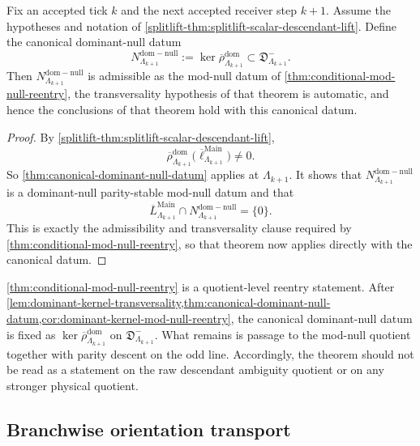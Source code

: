 \documentclass[11pt]{article}
\begin{document}
\begin{corollary}
\label{cor:dominant-kernel-mod-null-reentry}
Fix an accepted tick \(k\) and the next accepted receiver step \(k+1\).
Assume the hypotheses and notation of
\cref{splitlift-thm:splitlift-scalar-descendant-lift}.
Define the canonical dominant-null datum
\[
N^{\mathrm{dom-null}}_{\Lambda_{k+1}}
:=
\ker \overline{\rho}^{\mathrm{dom}}_{\Lambda_{k+1}}
\subset
\mathfrak D^-_{\Lambda_{k+1}}.
\]
Then \(N^{\mathrm{dom-null}}_{\Lambda_{k+1}}\) is admissible as the mod-null datum of
\cref{thm:conditional-mod-null-reentry}, the transversality hypothesis of that theorem is
automatic, and hence the conclusions of that theorem hold with this canonical datum.
\end{corollary}

\begin{proof}
By \cref{splitlift-thm:splitlift-scalar-descendant-lift},
\[
\overline{\rho}^{\mathrm{dom}}_{\Lambda_{k+1}}
\!\bigl(
\overline\ell^{\mathrm{Main}}_{\Lambda_{k+1}}
\bigr)
\neq 0.
\]
So \cref{thm:canonical-dominant-null-datum} applies at \(\Lambda_{k+1}\).
It shows that
\(
N^{\mathrm{dom-null}}_{\Lambda_{k+1}}
\)
is a dominant-null parity-stable mod-null datum and that
\[
\overline L^{\mathrm{Main}}_{\Lambda_{k+1}}
\cap
N^{\mathrm{dom-null}}_{\Lambda_{k+1}}
=
\{0\}.
\]
This is exactly the admissibility and transversality clause required by
\cref{thm:conditional-mod-null-reentry}, so that theorem now applies directly with the canonical
datum.
\end{proof}

\begin{remark}
\label{rem:conditional-mod-null-reentry}
\cref{thm:conditional-mod-null-reentry} is a quotient-level reentry statement.
After
\cref{lem:dominant-kernel-transversality,thm:canonical-dominant-null-datum,cor:dominant-kernel-mod-null-reentry},
the canonical dominant-null datum is fixed as
\(
\ker\overline{\rho}^{\mathrm{dom}}_{\Lambda_{k+1}}
\)
on \(\mathfrak D^-_{\Lambda_{k+1}}\).
What remains is passage to the mod-null quotient together with parity descent on the odd line.
Accordingly, the theorem should not be read as a statement on the raw descendant ambiguity quotient
or on any stronger physical quotient.
\end{remark}

\subsection*{Branchwise orientation transport}
\label{subsec:branchwise-orientation}
\end{document}
